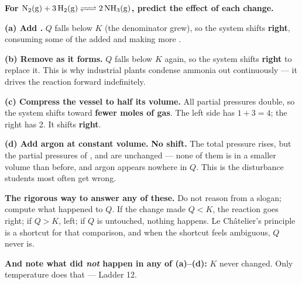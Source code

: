 \documentclass{apchem-worksheet}
\begin{document}
\begin{center}
\end{center}

\begin{workedexample}
\textbf{For $\ce{N2(g) + 3H2(g) <=> 2NH3(g)}$, predict the effect of
each change.}

\textbf{(a) Add .} $Q$ falls below $K$ (the denominator grew), so
the system shifts \textbf{right}, consuming some of the added 
and making more .

\textbf{(b) Remove  as it forms.} $Q$ falls below $K$ again, so
the system shifts \textbf{right} to replace it. This is why industrial
plants condense ammonia out continuously --- it drives the reaction
forward indefinitely.

\textbf{(c) Compress the vessel to half its volume.} All partial
pressures double, so the system shifts toward \textbf{fewer moles of
gas}. The left side has $1 + 3 = 4$; the right has 2. It shifts
\textbf{right}.

\textbf{(d) Add argon at constant volume.} \textbf{No shift.} The total
pressure rises, but the partial pressures of ,  and
 are unchanged --- none of them is in a smaller volume than
before, and argon appears nowhere in $Q$. This is the disturbance
students most often get wrong.

\textbf{The rigorous way to answer any of these.} Do not reason from a
slogan; compute what happened to $Q$. If the change made $Q < K$, the
reaction goes right; if $Q > K$, left; if $Q$ is untouched, nothing
happens. Le Ch\^{a}telier's principle is a shortcut for that comparison,
and when the shortcut feels ambiguous, $Q$ never is.

\textbf{And note what did \emph{not} happen in any of (a)--(d):} $K$
never changed. Only temperature does that --- Ladder 12.
\end{workedexample}
\end{document}
